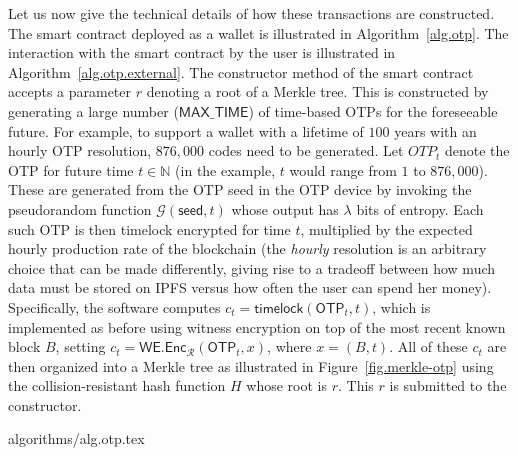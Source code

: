Let us now give the technical details of how these transactions are constructed.
The smart contract deployed as a wallet is illustrated in Algorithm~\ref{alg.otp}.
The interaction with the smart contract by the user is illustrated in Algorithm~\ref{alg.otp.external}.
The constructor method of the smart contract accepts a parameter $r$
denoting a root of a Merkle tree. This is constructed by generating a large number ($\textsf{MAX\_TIME}$)
of time-based OTPs for the foreseeable future. For example, to support a wallet with
a lifetime of $100$ years with an hourly OTP resolution, $876{,}000$ codes need to
be generated. Let ${OTP}_t$ denote the OTP for future time $t \in \mathbb{N}$ (in
the example, $t$ would range from $1$ to $876{,}000$). These are generated from
the OTP seed in the OTP device by invoking the pseudorandom function
$\mathcal{G}(\textsf{seed}, t)$ whose output has $\lambda$ bits of entropy.
Each such OTP is then timelock encrypted for time $t$, multiplied by the expected
hourly production rate of the blockchain (the \emph{hourly} resolution is an arbitrary
choice that can be made differently, giving rise to a tradeoff between how much
data must be stored on IPFS versus how often the user can spend her money).
Specifically, the software computes $c_t = \textsf{timelock}(\textsf{OTP}_t, t)$,
which is implemented as before using witness encryption on top of the most recent
known block $B$, setting $c_t = \textsf{WE.Enc}_\mathcal{R}(\textsf{OTP}_t, x)$, where $x = (B, t)$.
All of these $c_t$ are then organized into a Merkle tree as illustrated in
Figure~\ref{fig.merkle-otp}
using the collision-resistant hash function $H$ whose root is $r$. This $r$ is submitted
to the constructor.

{algorithms/alg.otp.tex}

